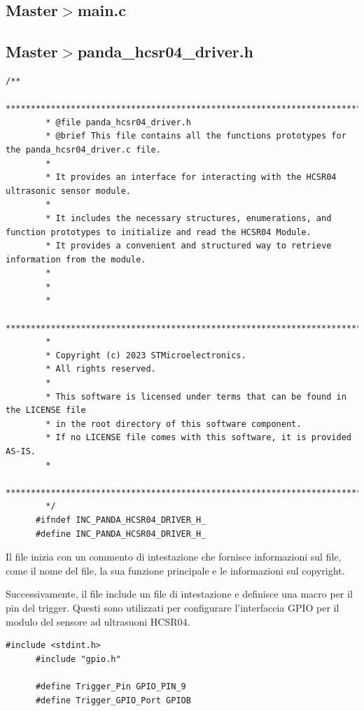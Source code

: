 \documentclass{article}
\begin{document}
    \subsection{Master$>$main.c}
    \subsection{Master$>$panda\_hcsr04\_driver.h}
    \begin{lstlisting}[style=CStyle]
      /**
        ******************************************************************************
        * @file panda_hcsr04_driver.h
        * @brief This file contains all the functions prototypes for the panda_hcsr04_driver.c file.
        *
        * It provides an interface for interacting with the HCSR04 ultrasonic sensor module.
        *
        * It includes the necessary structures, enumerations, and function prototypes to initialize and read the HCSR04 Module.
        * It provides a convenient and structured way to retrieve information from the module.
        *
        *
        *
        ******************************************************************************
        *
        * Copyright (c) 2023 STMicroelectronics.
        * All rights reserved.
        *
        * This software is licensed under terms that can be found in the LICENSE file
        * in the root directory of this software component.
        * If no LICENSE file comes with this software, it is provided AS-IS.
        *
        ******************************************************************************
        */
      #ifndef INC_PANDA_HCSR04_DRIVER_H_
      #define INC_PANDA_HCSR04_DRIVER_H_
      \end{lstlisting}
      
      Il file inizia con un commento di intestazione che fornisce informazioni sul file, come il nome del file, la sua funzione principale e le informazioni sul copyright.
      
      Successivamente, il file include un file di intestazione e definisce una macro per il pin del trigger. Questi sono utilizzati per configurare l'interfaccia GPIO per il modulo del sensore ad ultrasuoni HCSR04.
      
      \begin{lstlisting}[style=CStyle]
      #include <stdint.h>
      #include "gpio.h"
      
      #define Trigger_Pin GPIO_PIN_9
      #define Trigger_GPIO_Port GPIOB
      \end{lstlisting}
      
\end{document}
